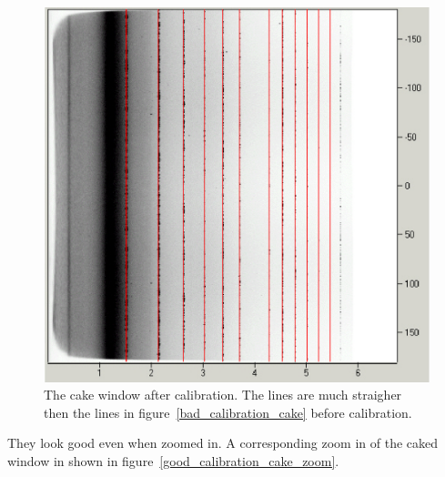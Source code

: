 \begin{figure}
    \centering
    \includegraphics[scale=.75]{figures/good_calibration_cake.eps}
    \caption{The cake window after calibration.  The lines 
    are much straigher then the lines in 
    figure~\ref{bad_calibration_cake} before calibration.}
    \label{good_calibration_cake}
\end{figure}

They look good even when zoomed in. A corresponding zoom in of
the caked window in shown in 
figure~\ref{good_calibration_cake_zoom}.

